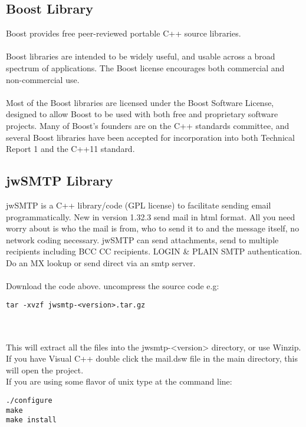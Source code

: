 \newpage

\subsection{Boost Library}

Boost provides free peer-reviewed portable C++ source libraries.\\ \\
Boost libraries are intended to be widely useful, and usable across a
broad spectrum of applications. The Boost license encourages both
commercial and non-commercial use.\\ \\
Most of the Boost libraries are licensed under the Boost Software
License, designed to allow Boost to be used with both free and
proprietary software projects. Many of Boost's founders are on the C++
standards committee, and several Boost libraries have been accepted
for incorporation into both Technical Report 1 and the C++11 standard.

\newpage

\subsection{jwSMTP Library}

jwSMTP is a C++ library/code (GPL license) to facilitate sending email
programmatically. New in version 1.32.3 send mail in html format. All
you need worry about is who the mail is from, who to send it to and
the message itself, no network coding necessary. jwSMTP can send
attachments, send to multiple recipients including BCC CC recipients.
LOGIN \& PLAIN SMTP authentication. Do an MX lookup or send direct via
an smtp server. \\ \\
Download the code above. uncompress the source code e.g:
\begin{verbatim}
tar -xvzf jwsmtp-<version>.tar.gz
\end{verbatim}\\ \\
This will extract all the files into the jwsmtp-<version> directory,
or use Winzip.\\
If you have Visual C++ double click the mail.dsw file in the main
directory, this will open the project.\\
If you are using some flavor of unix type at the command line:

\begin{verbatim}
./configure
make
make install
\end{verbatim}

